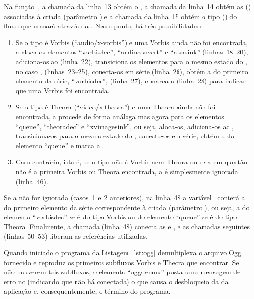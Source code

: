 \documentclass{SBCbookchapter}
\begin{document}
Na função~, a chamada da linha~13 obtém o , a
chamada da linha~14 obtém as  () associadas à
 criada (parâmetro ) e a chamada da linha~15
obtém o tipo () do fluxo que escoará através da .
Nesse ponto, há três possibilidades:
\begin{enumerate}
\item Se o tipo é Vorbis (``audio/x-vorbis'') e uma  Vorbis ainda
  não foi encontrada, a  aloca os elementos ``vorbisdec'',
  ``audioconvert'' e ``alsasink'' (linhas~18--20), adiciona-os ao
   (linha~22), transiciona os elementos para o mesmo estado do
  , no caso , (linhas~23--25), conecta-os em série
  (linha~26), obtém a  do primeiro elemento da série,
  ``vorbisdec'', (linha~27), e marca a  
  (linha~28) para indicar que uma  Vorbis foi encontrada.
\item Se o tipo é Theora (``video/x-theora'') e uma  Theora ainda
  não foi encontrada, a  procede de forma análoga mas agora
  para os elementos ``queue'', ``theoradec'' e ``xvimagesink'', ou seja,
  aloca-os, adiciona-os ao , transiciona-os para o mesmo estado
  do , conecta-os em série, obtém a  do elemento
  ``queue'' e marca a  .
\item Caso contrário, isto é, se o tipo não é Vorbis nem Theora ou se a
   em questão não é a primeira Vorbis ou Theora encontrada, a
   é simplesmente ignorada (linha~46).
\end{enumerate}
Se a  não for ignorada (casos~1 e~2 anteriores), na linha~48 a
variável~ conterá a  do primeiro elemento da série
correspondente à  criada (parâmetro ), ou seja,
a  do elemento ``vorbisdec'' se  é do tipo Vorbis ou
do elemento ``queue'' se  é do tipo Theora.  Finalmente, a chamada
 (linha~48) conecta as   e , e
as chamadas seguintes (linhas~50--53) liberam as referências utilizadas.

\clearpage


Quando iniciado o programa da Listagem~\ref{lst:ogg} demultiplexa o arquivo
Ogg fornecido e reproduz os primeiros subfluxos Vorbis e Theora que
encontrar.  Se não houverem tais subfluxos, o elemento ``oggdemux'' posta
uma mensagem de erro no  (indicando que não há 
conectada) o que causa o desbloqueio da  da aplicação e,
consequentemente, o término do programa.
\end{document}
